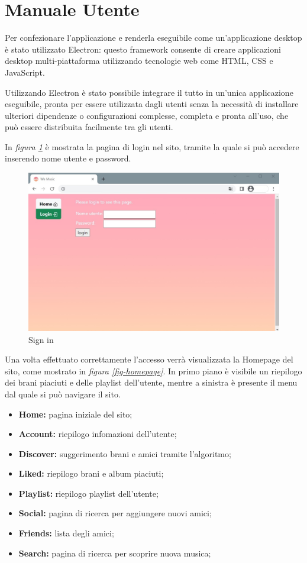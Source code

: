 \section{Manuale Utente}
Per confezionare l'applicazione e renderla eseguibile come un'applicazione desktop è 
stato utilizzato Electron: questo framework consente di creare applicazioni 
desktop multi-piattaforma utilizzando tecnologie web come HTML, CSS e JavaScript.

Utilizzando Electron è stato possibile integrare il tutto in un'unica applicazione eseguibile, 
pronta per essere utilizzata dagli utenti senza la necessità di installare ulteriori dipendenze o configurazioni complesse, 
completa e pronta all'uso, che può essere distribuita facilmente tra gli utenti.

In \textit{figura \ref{fig-signin}} è mostrata la pagina di login nel sito, tramite la quale si può accedere inserendo
nome utente e password. 
\begin{figure}[H]
    \centering
    \includegraphics[scale=0.4]{images/login_ver2.jpg}
    \caption{Sign in}
    \label{fig-signin}
\end{figure}
\newpage
Una volta effettuato correttamente l'accesso verrà visualizzata la Homepage del sito, come mostrato 
in \textit{figura \ref{fig-homepage}}. In primo piano è visibile un riepilogo dei brani piaciuti e delle playlist dell'utente,
mentre a sinistra è presente il menu dal quale si può navigare il sito. 
\begin{itemize}
    \item \textbf{Home:} pagina iniziale del sito;
    \item \textbf{Account:} riepilogo infomazioni dell'utente;
    \item \textbf{Discover:} suggerimento brani e amici tramite l'algoritmo;
    \item \textbf{Liked:} riepilogo brani e album piaciuti;
    \item \textbf{Playlist:} riepilogo playlist dell'utente;
    \item \textbf{Social:} pagina di ricerca per aggiungere nuovi amici;
    \item \textbf{Friends:} lista degli amici;
    \item \textbf{Search:} pagina di ricerca per scoprire nuova musica;
\end{itemize} 
